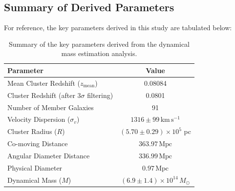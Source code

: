 \documentclass[12pt]{article}
\begin{document}
\subsection*{Summary of Derived Parameters}

For reference, the key parameters derived in this study are tabulated below:

\begin{table}[H]
    \centering
    \renewcommand{\arraystretch}{1.2} %
    \begin{tabular}{|l|c|}
        \hline
        \textbf{Parameter} & \textbf{Value} \\
        \hline
        Mean Cluster Redshift ($z_{\mathrm{mean}}$) & 0.08084 \\
        Cluster Redshift (after 3$\sigma$ filtering) & 0.0801 \\
        Number of Member Galaxies & 91 \\
        Velocity Dispersion ($\sigma_v$) & $1316 \pm 99 \,\mathrm{km \, s^{-1}}$ \\
        Cluster Radius ($R$) & $(5.70 \pm 0.29) \times 10^{5}$ pc \\
        Co-moving Distance & $363.97 \,\mathrm{Mpc}$ \\
        Angular Diameter Distance & $336.99 \,\mathrm{Mpc}$ \\
        Physical Diameter & $0.97 \,\mathrm{Mpc}$ \\
        Dynamical Mass ($M$) & $(6.9 \pm 1.4) \times 10^{14} \, M_\odot$ \\
        \hline
    \end{tabular}
    \caption{Summary of the key parameters derived from the dynamical mass estimation analysis.}
\end{table}
\end{document}
